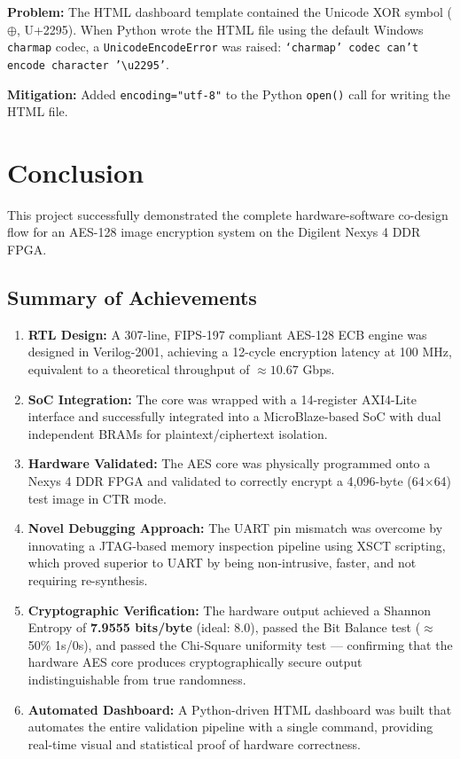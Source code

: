 \textbf{Problem:} The HTML dashboard template contained the Unicode XOR symbol ($\oplus$, U+2295). When Python wrote the HTML file using the default Windows \texttt{charmap} codec, a \texttt{UnicodeEncodeError} was raised: \texttt{`charmap' codec can't encode character '\textbackslash u2295'}.

\textbf{Mitigation:} Added \texttt{encoding="utf-8"} to the Python \texttt{open()} call for writing the HTML file.

\section{Conclusion}

This project successfully demonstrated the complete hardware-software co-design flow for an AES-128 image encryption system on the Digilent Nexys 4 DDR FPGA.

\subsection{Summary of Achievements}

\begin{enumerate}[leftmargin=*]
    \item \textbf{RTL Design:} A 307-line, FIPS-197 compliant AES-128 ECB engine was designed in Verilog-2001, achieving a 12-cycle encryption latency at 100 MHz, equivalent to a theoretical throughput of $\approx 10.67$ Gbps.
    
    \item \textbf{SoC Integration:} The core was wrapped with a 14-register AXI4-Lite interface and successfully integrated into a MicroBlaze-based SoC with dual independent BRAMs for plaintext/ciphertext isolation.
    
    \item \textbf{Hardware Validated:} The AES core was physically programmed onto a Nexys 4 DDR FPGA and validated to correctly encrypt a 4,096-byte (64$\times$64) test image in CTR mode.
    
    \item \textbf{Novel Debugging Approach:} The UART pin mismatch was overcome by innovating a JTAG-based memory inspection pipeline using XSCT scripting, which proved superior to UART by being non-intrusive, faster, and not requiring re-synthesis.
    
    \item \textbf{Cryptographic Verification:} The hardware output achieved a Shannon Entropy of \textbf{7.9555 bits/byte} (ideal: 8.0), passed the Bit Balance test ($\approx$50\% 1s/0s), and passed the Chi-Square uniformity test --- confirming that the hardware AES core produces cryptographically secure output indistinguishable from true randomness.
    
    \item \textbf{Automated Dashboard:} A Python-driven HTML dashboard was built that automates the entire validation pipeline with a single command, providing real-time visual and statistical proof of hardware correctness.
\end{enumerate}

